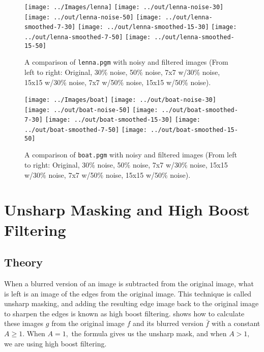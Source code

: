 \documentclass[headings=optiontoheadandtoc,listof=totoc,parskip=full]{scrartcl}
\begin{document}
\begin{figure}[H]
	\centering
	\texttt{[image: ../Images/lenna]}
	\texttt{[image: ../out/lenna-noise-30]}
	\texttt{[image: ../out/lenna-noise-50]}
	\texttt{[image: ../out/lenna-smoothed-7-30]}
	\texttt{[image: ../out/lenna-smoothed-15-30]}
	\texttt{[image: ../out/lenna-smoothed-7-50]}
	\texttt{[image: ../out/lenna-smoothed-15-50]}
	\caption{A comparison of \texttt{lenna.pgm} with noisy and filtered images (From left to right: Original, 30\% noise, 50\% noise, 7x7 w/30\% noise, 15x15 w/30\% noise, 7x7 w/50\% noise, 15x15 w/50\% noise).}
	\label{fig:median-result-3}
\end{figure}


\begin{figure}[H]
	\centering
	\texttt{[image: ../Images/boat]}
	\texttt{[image: ../out/boat-noise-30]}
	\texttt{[image: ../out/boat-noise-50]}
	\texttt{[image: ../out/boat-smoothed-7-30]}
	\texttt{[image: ../out/boat-smoothed-15-30]}
	\texttt{[image: ../out/boat-smoothed-7-50]}
	\texttt{[image: ../out/boat-smoothed-15-50]}
	\caption{A comparison of \texttt{boat.pgm} with noisy and filtered images (From left to right: Original, 30\% noise, 50\% noise, 7x7 w/30\% noise, 15x15 w/30\% noise, 7x7 w/50\% noise, 15x15 w/50\% noise).}
	\label{fig:median-result-4}
\end{figure}


\section{Unsharp Masking and High Boost Filtering}
\label{sec:unsharp}

\subsection{Theory}
When a blurred version of an image is subtracted from the original image, what is left is an image of the edges from the original image. This technique is called unsharp masking, and adding the resulting edge image back to the original image to sharpen the edges is known as high boost filtering.  shows how to calculate these images $g$ from the original image $f$ and its blurred version $\bar{f}$ with a constant $A \geq 1$. When $A = 1,$ the formula gives us the unsharp mask, and when $A > 1,$ we are using high boost filtering.
\end{document}
